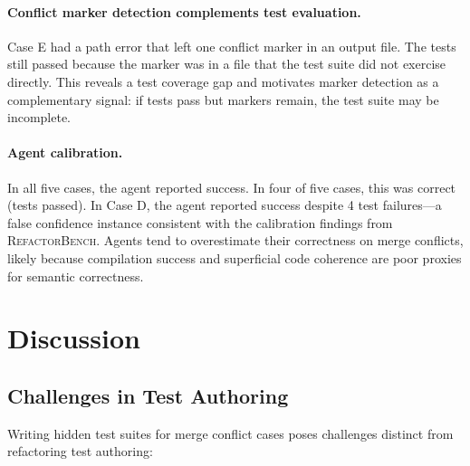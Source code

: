 \documentclass[11pt,a4paper]{article}
\begin{document}
\paragraph{Conflict marker detection complements test evaluation.} Case E had a path error that left one conflict marker in an output file. The tests still passed because the marker was in a file that the test suite did not exercise directly. This reveals a test coverage gap and motivates marker detection as a complementary signal: if tests pass but markers remain, the test suite may be incomplete.

\paragraph{Agent calibration.} In all five cases, the agent reported success. In four of five cases, this was correct (tests passed). In Case D, the agent reported success despite 4 test failures---a false confidence instance consistent with the calibration findings from \textsc{RefactorBench}. Agents tend to overestimate their correctness on merge conflicts, likely because compilation success and superficial code coherence are poor proxies for semantic correctness.

\section{Discussion}
\label{sec:discussion}

\subsection{Challenges in Test Authoring}

Writing hidden test suites for merge conflict cases poses challenges distinct from refactoring test authoring:
\end{document}
